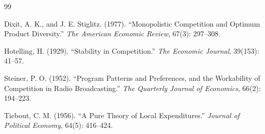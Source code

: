 \documentclass[AER]{AEA}
\begin{document}
\FloatBarrier

\begin{thebibliography}{99}

Dixit, A. K., and J. E. Stiglitz. (1977). ``Monopolistic Competition and Optimum Product Diversity.'' \textit{The American Economic Review}, 67(3): 297--308.

Hotelling, H. (1929). ``Stability in Competition.'' \textit{The Economic Journal}, 39(153): 41--57.

Steiner, P. O. (1952). ``Program Patterns and Preferences, and the Workability of Competition in Radio Broadcasting.'' \textit{The Quarterly Journal of Economics}, 66(2): 194--223.

Tiebout, C. M. (1956). ``A Pure Theory of Local Expenditures.'' \textit{Journal of Political Economy}, 64(5): 416--424.

\end{thebibliography}
\end{document}
